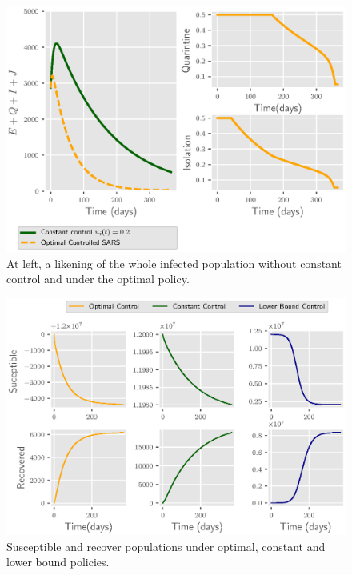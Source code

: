 \begin{figure}[t]
  \centering
  \includegraphics{Figures/figure_1_sars}
  \caption{At left, a likening of the whole infected population
  without constant control and under the optimal policy. }
  \label{fig:figure1sars}
\end{figure}

\begin{figure}[H]
  \centering
  \includegraphics{Figures/figure_2_sars}
  \caption{Susceptible and recover populations under
  optimal, constant and lower bound policies.}
  \label{fig:figure2sars}
\end{figure}

